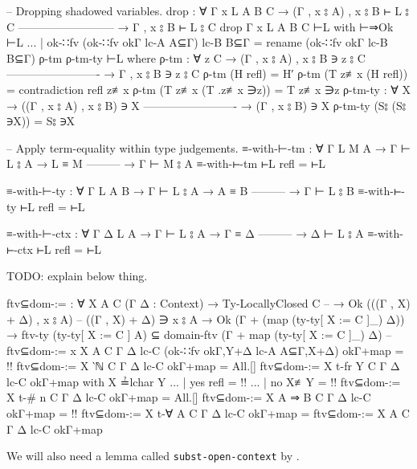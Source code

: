\documentclass[logo,bsc,singlespacing,parskip,online]{infthesis}
\renewenvironment{code}{\mintedcopy[breaklines,breaksymbolleft=\;]{agda}}{\endmintedcopy}
\begin{document}
\begin{code}
  -- Dropping shadowed variables.
  drop : ∀ {Γ x L A B C}
    → (Γ , x ⦂ A) , x ⦂ B ⊢ L ⦂ C
      --------------------------
    → Γ , x ⦂ B ⊢ L ⦂ C
  drop {Γ} {x} {L} {A} {B} {C} ⊢L with ⊢⇒Ok ⊢L
  ... | ok-∷fv (ok-∷fv okΓ lc-A A⊆Γ) lc-B B⊆Γ =
    rename (ok-∷fv okΓ lc-B B⊆Γ) ρ-tm ρ-tm-ty ⊢L
    where
      ρ-tm : ∀ {z C}
        → (Γ , x ⦂ A) , x ⦂ B ∋ z ⦂ C
          -------------------------
        → Γ , x ⦂ B ∋ z ⦂ C
      ρ-tm (H refl) = H′
      ρ-tm (T z≢x (H refl)) = contradiction refl z≢x
      ρ-tm (T z≢x (T .z≢x ∋z)) = T z≢x ∋z
      ρ-tm-ty : ∀ {X}
        → ((Γ , x ⦂ A) , x ⦂ B) ∋ X
          -------------------------
        → (Γ , x ⦂ B) ∋ X
      ρ-tm-ty (S⦂ (S⦂ ∋X)) = S⦂ ∋X

  -- Apply term-equality within type judgements.
  ≡-with-⊢-tm : ∀ {Γ L M A}
    → Γ ⊢ L ⦂ A
    → L ≡ M
      ---------
    → Γ ⊢ M ⦂ A
  ≡-with-⊢-tm ⊢L refl = ⊢L

  ≡-with-⊢-ty : ∀ {Γ L A B}
    → Γ ⊢ L ⦂ A
    → A ≡ B
      ---------
    → Γ ⊢ L ⦂ B
  ≡-with-⊢-ty ⊢L refl = ⊢L

  ≡-with-⊢-ctx : ∀ {Γ Δ L A}
    → Γ ⊢ L ⦂ A
    → Γ ≡ Δ
      ---------
    → Δ ⊢ L ⦂ A
  ≡-with-⊢-ctx ⊢L refl = ⊢L
\end{code}

TODO: explain below thing.

\begin{code}
  ftv⊆dom-:= : ∀ {X A C}
    (Γ Δ : Context)
     → Ty-LocallyClosed C
     -- → Ok (((Γ , X) + Δ) , x ⦂ A) -- ((Γ , X) + Δ) ∋ x ⦂ A
     → Ok (Γ + (map (ty-ty[ X := C ]_) Δ))
     → ftv-ty (ty-ty[ X := C ] A) ⊆ domain-ftv (Γ + map (ty-ty[ X := C ]_) Δ)
  -- ftv⊆dom-:= {x} {X} {A} {C} Γ Δ lc-C (ok-∷fv okΓ,Y+Δ lc-A A⊆Γ,X+Δ) okΓ+map = {!!}
  ftv⊆dom-:= {X} {‵ℕ} {C} Γ Δ lc-C okΓ+map = All.[]
  ftv⊆dom-:= {X} {t-fr Y} {C} Γ Δ lc-C okΓ+map with X ≟lchar Y
  ... | yes refl = {!!}
  ... | no  X≢Y  = {!!}
  ftv⊆dom-:= {X} {t-# n} {C} Γ Δ lc-C okΓ+map = All.[]
  ftv⊆dom-:= {X} {A ⇒ B} {C} Γ Δ lc-C okΓ+map = {!!}
  ftv⊆dom-:= {X} {t-∀ A} {C} Γ Δ lc-C okΓ+map = ftv⊆dom-:= {X} {A} {C} Γ Δ lc-C okΓ+map
\end{code}

We will also need a lemma called \texttt{subst-open-context} by \citet{chargueraud_locally_2012}.
\end{document}
